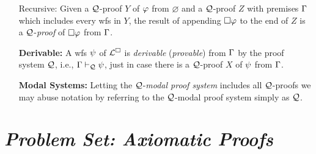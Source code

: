 \documentclass[a4paper, 11pt]{article} %
\begin{document}
\begin{enumerate}[leftmargin=1.2in,itemsep=2pt]
  \item[\sc Recursive:] Given a $\mathcal{Q}$-proof $Y$ of $\varphi$ from $\varnothing$ and a $\mathcal{Q}$-proof $Z$ with premises $\Gamma$ which includes every wfs in $Y$, the result of appending $\Box\varphi$ to the end of $Z$ is a $\mathcal{Q}$-\textit{proof} of $\Box\varphi$ from $\Gamma$.
	\item[\bf Derivable:] A wfs $\psi$ of $\mathcal{L}^{\square}$ is \textit{derivable} (\textit{provable}) from $\Gamma$ by the proof system $\mathcal{Q}$, i.e., $\Gamma \vdash_{\mathcal{Q}} \psi$, just in case there is a $\mathcal{Q}$-proof $X$ of $\psi$ from $\Gamma$.
  \item[\bf Modal Systems:] Letting the $\mathcal{Q}$-\textit{modal proof system} includes all $\mathcal{Q}$-proofs we may abuse notation by referring to the $\mathcal{Q}$-modal proof system simply as $\mathcal{Q}$.
\end{enumerate}




\section*{\it Problem Set: Axiomatic Proofs}
\end{document}
